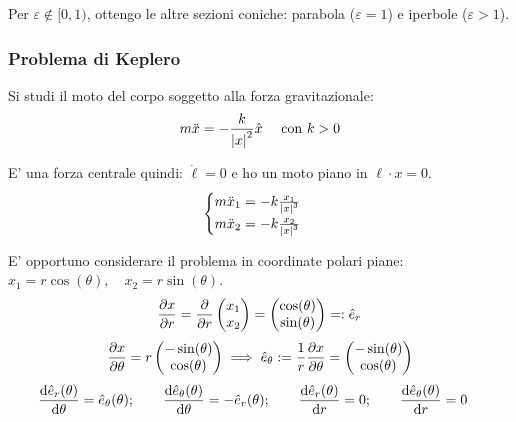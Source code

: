\begin{remark}
    Per $\varepsilon \notin [0,1)$, ottengo le altre sezioni coniche: parabola ($\varepsilon=1$) e iperbole ($\varepsilon>1$).
\end{remark}



\subsubsection{Problema di Keplero}
Si studi il moto del corpo soggetto alla forza gravitazionale:
\begin{equation}
    m\ddot{x}=-\frac{k}{\abs{x}^2}\hat{x} \quad \text{ con } k>0
\end{equation}

E' una forza centrale quindi: $\dot{\ell}=0$ e ho un moto piano in $\ell\cdot x=0$.
\begin{equation}
    \begin{cases}
        m\ddot{x}_1= -k\frac{x_1}{\abs{x}^3}\\
        m\ddot{x}_2= -k\frac{x_2}{\abs{x}^3}
    \end{cases}
\end{equation}

E' opportuno considerare il problema in coordinate polari piane: $x_1= r\cos(\theta), \quad x_2=r\sin(\theta)$. 
\begin{equation}
    \pdv{x}{r}= \pdv{}{r}\begin{pmatrix}
        x_1\\x_2
    \end{pmatrix}=\begin{pmatrix}
        \cos(\theta)\\\sin(\theta)
    \end{pmatrix}=:\hat{e}_r 
\end{equation}
\begin{equation}
    \pdv{x}{\theta}= r \begin{pmatrix}
        -\sin(\theta)\\\cos(\theta)
    \end{pmatrix}\implies 
    \hat{e}_\theta:=\frac{1}{r}\pdv{x}{\theta}= \begin{pmatrix}
        -\sin(\theta)\\\cos(\theta)
    \end{pmatrix}
\end{equation}
\begin{equation}
    \dv{\hat{e}_r(\theta)}{\theta} = \hat{e}_\theta(\theta) ; \qquad
    \dv{\hat{e}_\theta(\theta)}{\theta} = -\hat{e}_r(\theta) ; \qquad
    \dv{\hat{e}_r(\theta)}{r} = 0 ; \qquad
    \dv{\hat{e}_\theta(\theta)}{r} = 0\quad
\end{equation}

